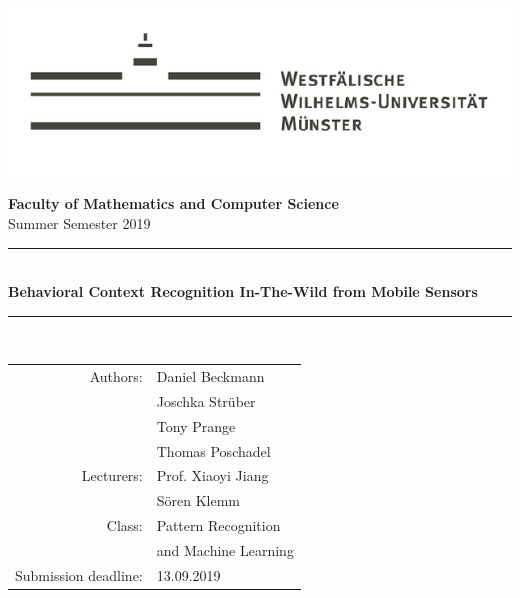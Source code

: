 \documentclass[a4paper,12pt]{scrartcl}
\begin{document}
	
	
	\begin{singlespace}
		\begin{titlepage}
			\begin{center}
				
				\includegraphics[scale=0.6]{wwu}
				
				\large{\textbf{\textsf{Faculty of Mathematics and Computer Science}}\\ 
					Summer Semester 2019} \\
				\vspace{20mm}
				\rule{.8\linewidth}{1pt}\\
				\vspace{3mm}
				\LARGE\textbf{\textsf{Behavioral Context Recognition In-The-Wild from Mobile Sensors}}\\
				\rule{.8\linewidth}{1pt}\\
				
				\vfill
			\end{center}
			\begin{flushright}
				\flushright
				
				\begin{large}
					\singlespacing 		
					\begin{tabular}{rl}
						
						Authors: & Daniel Beckmann \\ & Joschka Strüber \\& Tony Prange \\& Thomas Poschadel \\
						\midrule
						Lecturers: & Prof. Xiaoyi Jiang \\
						& Sören Klemm \\
						Class:& Pattern Recognition \\ & and Machine Learning \\
						Submission deadline: & 13.09.2019
						
					\end{tabular}
				\end{large}	
			\end{flushright}
			
			\flushleft
		\end{titlepage}
		
		\newpage  \tableofcontents \thispagestyle{empty} \vspace{15mm}
		
		
	\end{singlespace}
\end{document}
